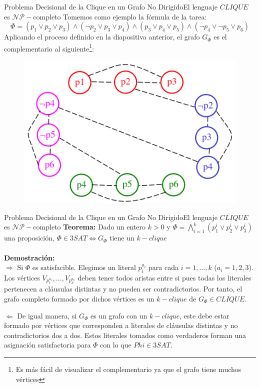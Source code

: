 \documentclass[10pt, envcountsect, presentation, aspectratio=169]{beamer}
\begin{document}
\begin{frame}{Problema Decisional de la Clique en un Grafo No Dirigido}{El lenguaje $CLIQUE$ es $\mathcal{NP}-$completo}
    Tomemos como ejemplo la fórmula de la tarea: 
    $$
    \Phi = (p_1 \vee p_2 \vee p_3) \wedge (\neg p_2 \vee p_3 \vee p_4) \wedge (p_3 \vee p_4 \vee p_5) \wedge(\neg p_4 \vee \neg p_5 \vee p_6)
    $$
    Aplicando el proceso definido en la diapositiva anterior, el grafo $G_\Phi$ es el complementario al siguiente\footnote{Es más fácil de visualizar el complementario ya que el grafo tiene muchos vértices}:
    \begin{figure}
        \includegraphics[scale=0.15]{images/T2_2_ejemplophi.png}
    \end{figure} 
\end{frame}

\begin{frame}{Problema Decisional de la Clique en un Grafo No Dirigido}{El lenguaje $CLIQUE$ es $\mathcal{NP}-$completo}
    \textbf{Teorema:} Dado un entero $k>0$ y $\Phi=\bigwedge_{i=1}^k(p_1^i \vee p_2^i \vee p_3^i)$ una proposición, $\Phi \in 3SAT \Leftrightarrow G_\Phi$ tiene un $k-clique$ \\~\\

    \textbf{Demostración:} \\
    $\boxed{\Rightarrow}$ Si $\Phi$ es satisfacible. Elegimos un literal $p_i^{a_i}$ para cada $i=1,\dots,k$ ($a_i=1,2,3$). Los vértices $V_{p_1^{a_1}},\dots,V_{p_k^{a_k}}$ deben tener todos aristas entre si pues todas los literales pertenecen a cláusulas distintas y no pueden ser contradictorios.
    Por tanto, el grafo completo formado por dichos vértices es un $k-clique$ de $G_\Phi \in CLIQUE$.

    $\boxed{\Leftarrow}$ De igual manera, si $G_\Phi$ es un grafo con un $k-clique$, este debe estar formado por vértices que corresponden a literales de cláusulas distintas y no contradictorios dos a dos.
    Estos literales tomados como verdaderos forman una asignación satisfactoria para $\Phi$ con lo que $Phi \in 3SAT$.
\end{frame}
\end{document}
